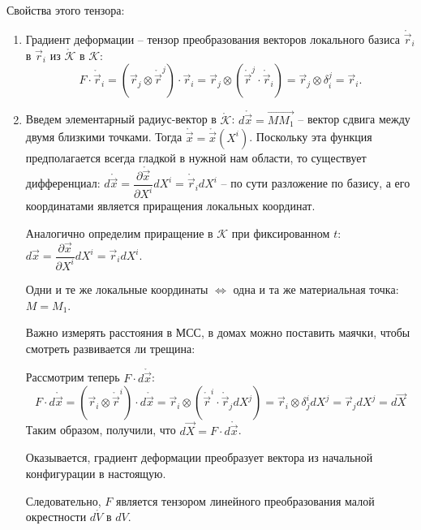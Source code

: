 Свойства этого тензора:
\begin{enumerate}
  \item Градиент деформации -- тензор преобразования векторов локального базиса $\mathring{\vec{r}}_i$ в $\vec{r}_i$ из $\mathring{\mathcal{K}}$ в $\mathcal{K}$:
    \[
      F \cdot \mathring{\vec{r}}_i
      = (\vec{r}_j \otimes \mathring{\vec{r}}^j) \cdot \vec{r}_i
      = \vec{r}_j \otimes (\mathring{\vec{r}}^j \cdot \mathring{\vec{r}}_i)
      = \vec{r}_j \otimes \delta^j_i = \vec{r}_i.
  \]

  \item Введем элементарный радиус-вектор в $\mathring{\mathcal{K}}$:
    $d\mathring{\vec{x}} = \vec{MM_1}$ -- вектор сдвига между двумя близкими точками.
    Тогда $\mathring{\vec{x}} = \mathring{\vec{x}} (X^i)$.
    Поскольку эта функция предполагается всегда гладкой в нужной нам области, то существует
    дифференциал: $d\mathring{\vec{x}} = \dfrac{\partial \mathring{\vec{x}}}{\partial X^i} dX^i
    = \mathring{\vec{r}}_i dX^i$ -- по сути разложение по базису, а его координатами является
    приращения локальных координат.


    Аналогично определим приращение в $\mathcal{K}$ при фиксированном $t$: 
    $d\vec{x} = \dfrac{\partial \vec{x}}{\partial X^i} dX^i = \vec{r}_i dX^i.$


    Одни и те же локальные координаты $\Leftrightarrow$ одна и та же материальная точка: $M = M_1$.

    Важно измерять расстояния в МСС, в домах можно поставить маячки, чтобы смотреть развивается ли
    трещина:

    Рассмотрим теперь $F \cdot d\mathring{\vec{x}}$:
    \[
      F \cdot d\mathring{\vec{x}}
      = (\vec{r}_i \otimes \mathring{\vec{r}}^i) \cdot d\mathring{\vec{x}}
      = \vec{r}_i \otimes (\mathring{\vec{r}}^i \cdot \mathring{\vec{r}}_j dX^j)
      = \vec{r}_i \otimes \delta^i_j dX^j
      = \vec{r}_j dX^j = d\vec{X}
    \]
    Таким образом, получили, что $d\vec{X} = F \cdot d\mathring{\vec{x}}$.

    Оказывается, градиент деформации преобразует вектора из начальной конфигурации в настоящую.


    Следовательно, $F$ является тензором линейного преобразования малой окрестности $d\mathring{V}$ в
    $dV$.


\end{enumerate}
